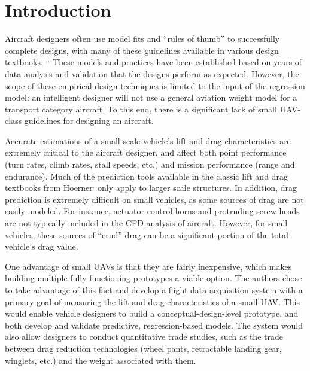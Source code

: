 \section{Introduction}
\label{intro}
Aircraft designers often use model fits and ``rules of thumb'' to successfully complete designs, with many of these guidelines available in various design textbooks. \cite{raymer}$^,$\cite{nicolai2010fundamentals}$^,$\cite{roskam1985airplane} These models and practices have been established based on years of data analysis and validation that the designs perform as expected. However, the scope of these empirical design techniques is limited to the input of the regression model: an intelligent designer will not use a general aviation weight model for a transport category aircraft. To this end, there is a significant lack of small UAV-class guidelines for designing an aircraft.

 Accurate estimations of a small-scale vehicle's lift and drag characteristics are extremely critical to the aircraft designer, and affect both point performance (turn rates, climb rates, stall speeds, etc.) and mission performance (range and endurance). Much of the prediction tools available in the classic lift and drag textbooks from Hoerner\cite{hoernerDrag}$^,$\cite{hoernerLift} only apply to larger scale structures. In addition, drag prediction is extremely difficult on small vehicles, as some sources of drag are not easily modeled. For instance, actuator control horns and protruding screw heads are not typically included in the CFD  analysis of aircraft. However, for small vehicles, these sources of ``crud'' drag can be a significant portion of the total vehicle's drag value. 
 
 One advantage of small UAVs is that they are fairly inexpensive, which makes building multiple fully-functioning prototypes a viable option. The authors chose to take advantage of this fact and develop a flight data acquisition system with a primary goal of measuring the lift and drag characteristics of a small UAV. This would enable vehicle designers to build a conceptual-design-level prototype, and both develop and validate predictive, regression-based models. The system would also allow designers to conduct quantitative trade studies, such as the trade between drag reduction technologies (wheel pants, retractable landing gear, winglets, etc.) and the weight associated with them.\\

